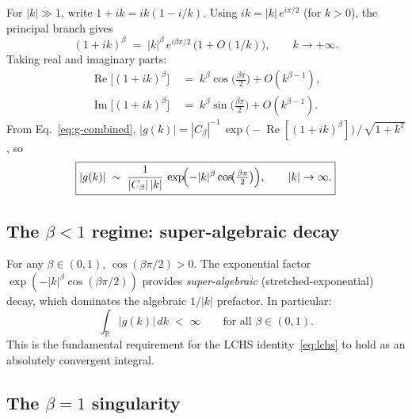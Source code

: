 \documentclass[11pt]{article}
\begin{document}
For $|k| \gg 1$, write $1 + ik = ik(1 - i/k)$.  Using
$ik = |k|\,e^{i\pi/2}$ (for $k > 0$), the principal branch gives
\begin{equation}\label{eq:asymp-base}
  (1+ik)^\beta \;=\; |k|^\beta\,e^{i\beta\pi/2}\,\bigl(1 + O(1/k)\bigr),
  \qquad k \to +\infty.
\end{equation}
Taking real and imaginary parts:
\begin{align}
  \operatorname{Re}\!\bigl[(1+ik)^\beta\bigr]
  &\;=\; k^\beta\cos\!\bigl(\tfrac{\beta\pi}{2}\bigr) + O(k^{\beta-1}),
  \label{eq:re-asymp} \\
  \operatorname{Im}\!\bigl[(1+ik)^\beta\bigr]
  &\;=\; k^\beta\sin\!\bigl(\tfrac{\beta\pi}{2}\bigr) + O(k^{\beta-1}).
  \label{eq:im-asymp}
\end{align}
From Eq.~\eqref{eq:g-combined}, $|g(k)| = |C_\beta|^{-1}\,
\exp\!\bigl(-\operatorname{Re}[(1+ik)^\beta]\bigr)\,/\,\sqrt{1+k^2}$, so
\begin{equation}\label{eq:g-decay}
  \boxed{%
  |g(k)| \;\sim\; \frac{1}{|C_\beta|\,|k|}\,
  \exp\!\Bigl(-|k|^\beta\cos\!\bigl(\tfrac{\beta\pi}{2}\bigr)\Bigr),
  \qquad |k| \to \infty.}
\end{equation}

\subsection{The $\beta < 1$ regime: super-algebraic decay}

For any $\beta \in (0,1)$, $\cos(\beta\pi/2) > 0$.  The exponential
factor $\exp(-|k|^\beta\cos(\beta\pi/2))$ provides
\emph{super-algebraic} (stretched-exponential) decay, which dominates
the algebraic $1/|k|$ prefactor.  In particular:
\begin{equation}\label{eq:g-integrable}
  \int_{\mathbb{R}} |g(k)|\,dk \;<\; \infty
  \qquad \text{for all } \beta \in (0,1).
\end{equation}
This is the fundamental requirement for the LCHS identity~\eqref{eq:lchs}
to hold as an absolutely convergent integral.

\subsection{The $\beta = 1$ singularity}
\end{document}
